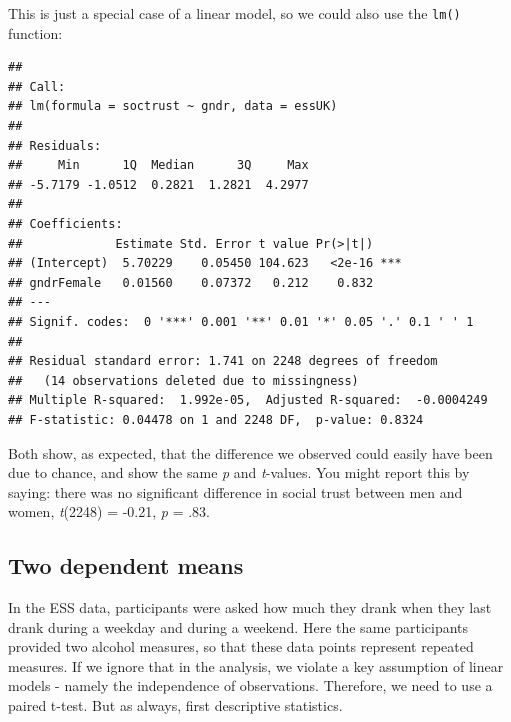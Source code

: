 \documentclass[
]{book}
\newenvironment{Shaded}{\begin{snugshade}}{\end{snugshade}}
\newcommand{\DataTypeTok}[1]{\textcolor[rgb]{0.13,0.29,0.53}{#1}}
\newcommand{\KeywordTok}[1]{\textcolor[rgb]{0.13,0.29,0.53}{\textbf{#1}}}
\newcommand{\NormalTok}[1]{#1}
\newcommand{\OperatorTok}[1]{\textcolor[rgb]{0.81,0.36,0.00}{\textbf{#1}}}
\newcommand{\StringTok}[1]{\textcolor[rgb]{0.31,0.60,0.02}{#1}}
\begin{document}
This is just a special case of a linear model, so we could also use the \texttt{lm()} function:

\begin{Shaded}
\end{Shaded}

\begin{verbatim}
## 
## Call:
## lm(formula = soctrust ~ gndr, data = essUK)
## 
## Residuals:
##     Min      1Q  Median      3Q     Max 
## -5.7179 -1.0512  0.2821  1.2821  4.2977 
## 
## Coefficients:
##             Estimate Std. Error t value Pr(>|t|)    
## (Intercept)  5.70229    0.05450 104.623   <2e-16 ***
## gndrFemale   0.01560    0.07372   0.212    0.832    
## ---
## Signif. codes:  0 '***' 0.001 '**' 0.01 '*' 0.05 '.' 0.1 ' ' 1
## 
## Residual standard error: 1.741 on 2248 degrees of freedom
##   (14 observations deleted due to missingness)
## Multiple R-squared:  1.992e-05,	Adjusted R-squared:  -0.0004249 
## F-statistic: 0.04478 on 1 and 2248 DF,  p-value: 0.8324
\end{verbatim}

Both show, as expected, that the difference we observed could easily have been due to chance, and show the same \emph{p} and \emph{t}-values. You might report this by saying: there was no significant difference in social trust between men and women, \emph{t}(2248) = -0.21, \emph{p} = .83.

\hypertarget{two-dependent-means}{%
\subsection{Two dependent means}\label{two-dependent-means}}

In the ESS data, participants were asked how much they drank when they last drank during a weekday and during a weekend. Here the same participants provided two alcohol measures, so that these data points represent repeated measures. If we ignore that in the analysis, we violate a key assumption of linear models - namely the independence of observations. Therefore, we need to use a paired t-test. But as always, first descriptive statistics.

\begin{Shaded}
\end{Shaded}
\end{document}
